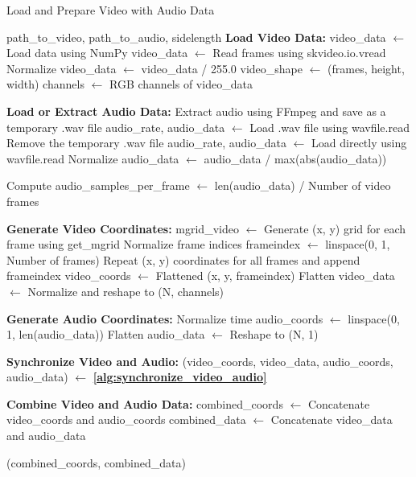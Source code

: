 \begin{algorithm}
    \caption{Load and Prepare Video with Audio Data}
    \label{alg:load_video_audio}
    \begin{algorithmic}[1]
    \REQUIRE path\_to\_video, path\_to\_audio, sidelength
    \STATE \textbf{Load Video Data:}
        \STATE video\_data $\gets$ Load data using NumPy
        \STATE video\_data $\gets$ Read frames using skvideo.io.vread
        \STATE Normalize video\_data $\gets$ video\_data / 255.0
    \ENDIF
    \STATE video\_shape $\gets$ (frames, height, width)
    \STATE channels $\gets$ RGB channels of video\_data
    
    \STATE \textbf{Load or Extract Audio Data:}
        \STATE Extract audio using FFmpeg and save as a temporary .wav file
        \STATE audio\_rate, audio\_data $\gets$ Load .wav file using wavfile.read
        \STATE Remove the temporary .wav file
    \ELSE
        \STATE audio\_rate, audio\_data $\gets$ Load directly using wavfile.read
    \ENDIF
    \STATE Normalize audio\_data $\gets$ audio\_data / max(abs(audio\_data))
    
    \STATE Compute audio\_samples\_per\_frame $\gets$ len(audio\_data) / Number of video frames
    
    \STATE \textbf{Generate Video Coordinates:}
    \STATE mgrid\_video $\gets$ Generate (x, y) grid for each frame using get\_mgrid
    \STATE Normalize frame indices frameindex $\gets$ linspace(0, 1, Number of frames)
    \STATE Repeat (x, y) coordinates for all frames and append frameindex
    \STATE video\_coords $\gets$ Flattened (x, y, frameindex)
    \STATE Flatten video\_data $\gets$ Normalize and reshape to (N, channels)
    
    \STATE \textbf{Generate Audio Coordinates:}
    \STATE Normalize time audio\_coords $\gets$ linspace(0, 1, len(audio\_data))
    \STATE Flatten audio\_data $\gets$ Reshape to (N, 1)
    
    \STATE \textbf{Synchronize Video and Audio:}
    \STATE (video\_coords, video\_data, audio\_coords, audio\_data) $\gets$ \textbf{\autoref{alg:synchronize_video_audio}}
    
    \STATE \textbf{Combine Video and Audio Data:}
    \STATE combined\_coords $\gets$ Concatenate video\_coords and audio\_coords
    \STATE combined\_data $\gets$ Concatenate video\_data and audio\_data
    
    \RETURN (combined\_coords, combined\_data)
    \end{algorithmic}
\end{algorithm}


